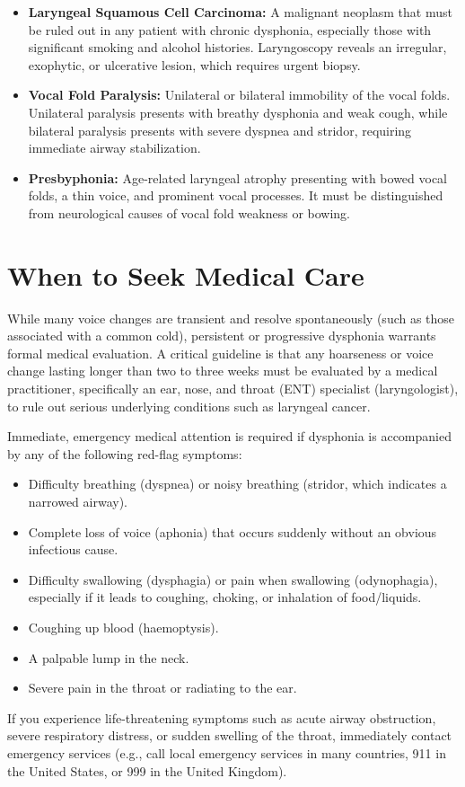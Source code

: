 \begin{itemize}
    \item \textbf{Laryngeal Squamous Cell Carcinoma:} A malignant neoplasm that must be ruled out in any patient with chronic dysphonia, especially those with significant smoking and alcohol histories. Laryngoscopy reveals an irregular, exophytic, or ulcerative lesion, which requires urgent biopsy.
    \item \textbf{Vocal Fold Paralysis:} Unilateral or bilateral immobility of the vocal folds. Unilateral paralysis presents with breathy dysphonia and weak cough, while bilateral paralysis presents with severe dyspnea and stridor, requiring immediate airway stabilization.
    \item \textbf{Presbyphonia:} Age-related laryngeal atrophy presenting with bowed vocal folds, a thin voice, and prominent vocal processes. It must be distinguished from neurological causes of vocal fold weakness or bowing.
\end{itemize}

\section*{When to Seek Medical Care}
While many voice changes are transient and resolve spontaneously (such as those associated with a common cold), persistent or progressive dysphonia warrants formal medical evaluation. A critical guideline is that any hoarseness or voice change lasting longer than two to three weeks must be evaluated by a medical practitioner, specifically an ear, nose, and throat (ENT) specialist (laryngologist), to rule out serious underlying conditions such as laryngeal cancer.

Immediate, emergency medical attention is required if dysphonia is accompanied by any of the following red-flag symptoms:
\begin{itemize}
    \item Difficulty breathing (dyspnea) or noisy breathing (stridor, which indicates a narrowed airway).
    \item Complete loss of voice (aphonia) that occurs suddenly without an obvious infectious cause.
    \item Difficulty swallowing (dysphagia) or pain when swallowing (odynophagia), especially if it leads to coughing, choking, or inhalation of food/liquids.
    \item Coughing up blood (haemoptysis).
    \item A palpable lump in the neck.
    \item Severe pain in the throat or radiating to the ear.
\end{itemize}
If you experience life-threatening symptoms such as acute airway obstruction, severe respiratory distress, or sudden swelling of the throat, immediately contact emergency services (e.g., call local emergency services in many countries, 911 in the United States, or 999 in the United Kingdom).

